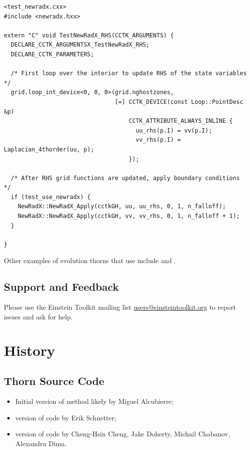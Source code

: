 \begin{verbatim}
<test_newradx.cxx>
#include <newradx.hxx>

extern "C" void TestNewRadX_RHS(CCTK_ARGUMENTS) {
  DECLARE_CCTK_ARGUMENTSX_TestNewRadX_RHS;
  DECLARE_CCTK_PARAMETERS;

  /* First loop over the interior to update RHS of the state variables */
  grid.loop_int_device<0, 0, 0>(grid.nghostzones,
                                [=] CCTK_DEVICE(const Loop::PointDesc &p)
                                    CCTK_ATTRIBUTE_ALWAYS_INLINE {
                                      uu_rhs(p.I) = vv(p.I);
                                      vv_rhs(p.I) = Laplacian_4thorder(uu, p);
                                    });

  /* After RHS grid functions are updated, apply boundary conditions */
  if (test_use_newradx) {
    NewRadX::NewRadX_Apply(cctkGH, uu, uu_rhs, 0, 1, n_falloff);
    NewRadX::NewRadX_Apply(cctkGH, vv, vv_rhs, 0, 1, n_falloff + 1);
  }

}
\end{verbatim}


Other examples of  evolution thorns that use 
include \cite{SpacetimeX_NewRadX_CanudaX_BSSNMoL}
and \cite{SpacetimeX_NewRadX_Z4c}.


\subsection{Support and Feedback}
Please use the Einstein Toolkit mailing list
\url{users@einsteintoolkit.org} to report issues and ask for help.

\section{History}

\subsection{Thorn Source Code}
\begin{itemize}
\item Initial version of method likely by Miguel Alcubierre;
\item {} version of code by Erik Schnetter;
\item {} version of code by Cheng-Hsin Cheng, Jake Doherty,
  Michail Chabanov, Alexandru Dima.
\end{itemize}

